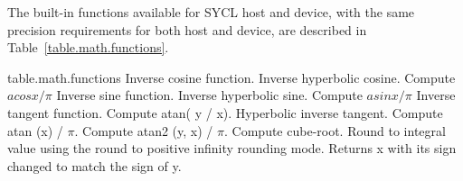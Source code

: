 The built-in functions available for SYCL host and device, with the same
precision requirements for both host and device, are described in
Table~\ref{table.math.functions}.

{table.math.functions}
 {Inverse cosine function.}
 {Inverse hyperbolic cosine.}
 {Compute $acos{x}/\pi$}
 {Inverse sine function.}
 {Inverse hyperbolic sine.}
 {Compute $asin{x}/\pi$}
 {Inverse tangent function.}
 {Compute atan( y / x).}
 { Hyperbolic inverse tangent.}
 {Compute atan (x) / $\pi$.}
 {Compute atan2 (y, x) / $\pi$.}
 { Compute cube-root.}
 {Round to integral value using the round to positive infinity
rounding mode.}
 {Returns x with its sign changed to match
the sign of y.}


